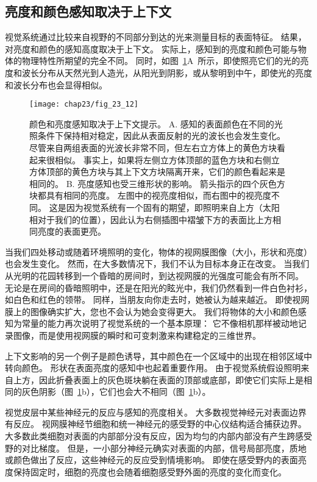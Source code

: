 \subsection{亮度和颜色感知取决于上下文}

视觉系统通过比较来自视野的不同部分到达的光来测量目标的表面特征。
结果，对亮度和颜色的感知高度取决于上下文。
实际上，感知到的亮度和颜色可能与物体的物理特性所期望的完全不同。
同时，如图~\ref{fig:23_12}A~所示，即使照亮它们的光的亮度和波长分布从天然光到人造光，从阳光到阴影，或从黎明到中午，即使光的亮度和波长分布也会显得相似。


\begin{figure}[htbp]
	\centering
	\texttt{[image: chap23/fig\_23\_12]}
	\caption{颜色和亮度感知取决于上下文提示。
		A. 感知的表面颜色在不同的光照条件下保持相对稳定，因此从表面反射的光的波长也会发生变化。
		尽管来自两组表面的光波长非常不同，但左右立方体上的黄色方块看起来很相似。
		事实上，如果将左侧立方体顶部的蓝色方块和右侧立方体顶部的黄色方块与其上下文方块隔离开来，它们的颜色看起来是相同的。
		B. 亮度感知也受三维形状的影响。
		箭头指示的四个灰色方块都具有相同的亮度。
		左图中的视亮度相似，而右图中的视亮度不同。
		这是因为视觉系统有一个固有的期望，即照明来自上方（太阳相对于我们的位置），因此认为右侧插图中褶皱下方的表面比上方相同亮度的表面更亮\cite{adelson1993perceptual}。}
	\label{fig:23_12}
\end{figure}


当我们四处移动或随着环境照明的变化，物体的视网膜图像（大小，形状和亮度）也会发生变化。
然而，在大多数情况下，我们不认为目标本身正在改变。
当我们从光明的花园转移到一个昏暗的房间时，到达视网膜的光强度可能会有所不同。
无论是在房间的昏暗照明中，还是在阳光的眩光中，我们仍然看到一件白色衬衫，如白色和红色的领带。
同样，当朋友向你走去时，她被认为越来越近。
即使视网膜上的图像确实扩大，您也不会认为她会变得更大。
我们将物体的大小和颜色感知为常量的能力再次说明了视觉系统的一个基本原理：
它不像相机那样被动地记录图像，而是使用视网膜的瞬时和可变刺激来构建稳定的三维世界。


上下文影响的另一个例子是颜色诱导，其中颜色在一个区域中的出现在相邻区域中转向颜色。
形状在表面亮度的感知中也起着重要作用。
由于视觉系统假设照明来自上方，因此折叠表面上的灰色斑块躺在表面的顶部或底部，即使它们实际上是相同的灰色阴影（图~\ref{fig:23_12}b），它们也会大不相同（图~\ref{fig:23_12}b）。


视觉皮层中某些神经元的反应与感知的亮度相关。
大多数视觉神经元对表面边界有反应。
视网膜神经节细胞和统一神经元的感受野的中心仪结构适合捕获边界。
大多数此类细胞对表面的内部部分没有反应，因为均匀的内部内部没有产生跨感受野的对比梯度。
但是，一小部分神经元确实对表面的内部，信号局部亮度，质地或颜色做出了反应，这些神经元的反应受到情境影响。
即使在感受野内的表面亮度保持固定时，细胞的亮度也会随着细胞感受野外面的亮度的变化而变化。


